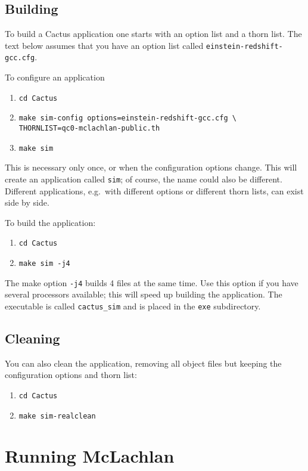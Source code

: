 \documentclass[11pt, tightenlines]{revtex4}
\newcommand{\code}[1]{\texttt{#1}}
\begin{document}
\subsection{Building}

To build a Cactus application one starts with an option list and a
thorn list.  The text below assumes that you have an option list
called \code{einstein-redshift-gcc.cfg}.

To configure an application
\begin{enumerate}
\item\verb+cd Cactus+
\item\verb+make sim-config options=einstein-redshift-gcc.cfg \+\\
  \verb+THORNLIST=qc0-mclachlan-public.th+
\item\verb+make sim+
\end{enumerate}
This is necessary only once, or when the configuration options change.
This will create an application called \code{sim}; of course, the name
could also be different.  Different applications, e.g.\ with different
options or different thorn lists, can exist side by side.

To build the application:
\begin{enumerate}
\item\verb+cd Cactus+
\item\verb+make sim -j4+
\end{enumerate}
The make option \code{-j4} builds 4 files at the same time.  Use this
option if you have several processors available; this will speed up
building the application.  The executable is called \code{cactus\_sim}
and is placed in the \code{exe} subdirectory.

\subsection{Cleaning}

You can also clean the application, removing all object files but
keeping the configuration options and thorn list:
\begin{enumerate}
\item\verb+cd Cactus+
\item\verb+make sim-realclean+
\end{enumerate}



\section{Running McLachlan}
\end{document}
